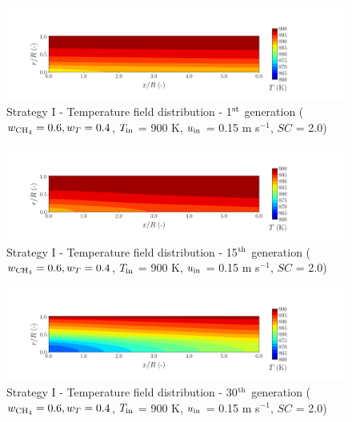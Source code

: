 \documentclass[preprint,12pt]{elsarticle}
\begin{document}
\begin{figure}[h!]
\centering
\includegraphics[width=190mm]{results/5/60C_40T/GEN1-TFIELD.png}
\caption{\label{fig:5R6040G1-TField} Strategy I - Temperature field distribution - 1$^{\rm{st}}$ generation ($w_{\rm{CH_4}} = 0.6, w_T = 0.4$, $T_{\rm{in}}$ = 900 K, $u_{\rm{in}}$ = 0.15 m s$^{-1}$, $SC$ = 2.0)}
\end{figure}

\begin{figure}[h!]
\centering
\includegraphics[width=190mm]{results/5/60C_40T/GEN15-TFIELD.png}
\caption{\label{fig:5R6040G15-TField} Strategy I - Temperature field distribution - 15$^{\rm{th}}$ generation ($w_{\rm{CH_4}} = 0.6, w_T = 0.4$, $T_{\rm{in}}$ = 900 K, $u_{\rm{in}}$ = 0.15 m s$^{-1}$, $SC$ = 2.0)}
\end{figure}

\begin{figure}[h!]
\centering
\includegraphics[width=190mm]{results/5/60C_40T/GEN30-TFIELD.png}
\caption{\label{fig:5R6040G30-TField} Strategy I - Temperature field distribution - 30$^{\rm{th}}$ generation ($w_{\rm{CH_4}} = 0.6, w_T = 0.4$, $T_{\rm{in}}$ = 900 K, $u_{\rm{in}}$ = 0.15 m s$^{-1}$, $SC$ = 2.0)}
\end{figure}
\end{document}
